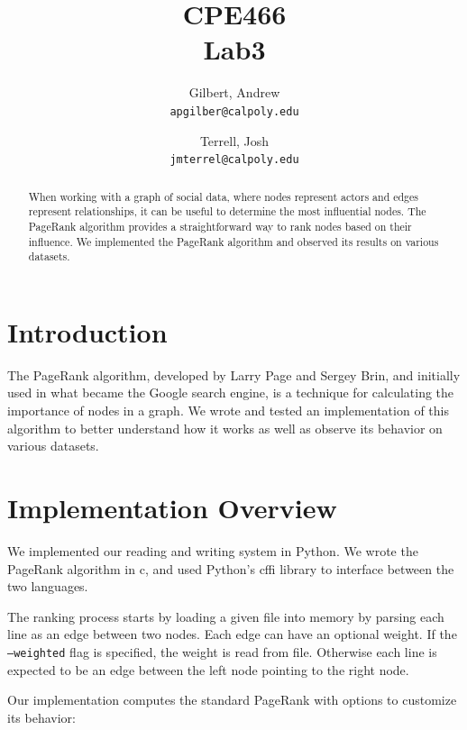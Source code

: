 \documentclass{report}
\title{CPE466\\Lab3}
\author{
  Gilbert, Andrew\\
  \texttt{apgilber@calpoly.edu}
  \and
  Terrell, Josh\\
  \texttt{jmterrel@calpoly.edu}
}
\date{}
\newcommand{\pagerank}{PageRank }
\begin{document}
\maketitle

\begin{abstract}
When working with a graph of social data, where nodes represent actors and edges
represent relationships, it can be useful to determine the most influential
nodes. The \pagerank algorithm provides a straightforward way to rank nodes based
on their influence. We implemented the \pagerank algorithm and observed its
results on various datasets.
\end{abstract}

\section{Introduction}
The \pagerank algorithm, developed by Larry Page and Sergey Brin, and initially
used in what became the Google search engine, is a technique for calculating the
importance of nodes in a graph. We wrote and tested an implementation of this
algorithm to better understand how it works as well as observe its behavior on
various datasets.

\section{Implementation Overview}
We implemented our reading and writing system in Python. We wrote the
\pagerank algorithm in c, and used Python's cffi library to interface between
the two languages.

The ranking process starts by loading a given file into memory by parsing each
line as an edge between two nodes. Each edge can have an optional weight. If the
\texttt{--weighted} flag is specified, the weight is read from file. Otherwise
each line is expected to be an edge between the left node pointing to the right
node.

Our implementation computes the standard \pagerank with options to customize its
behavior: 
\end{document}

